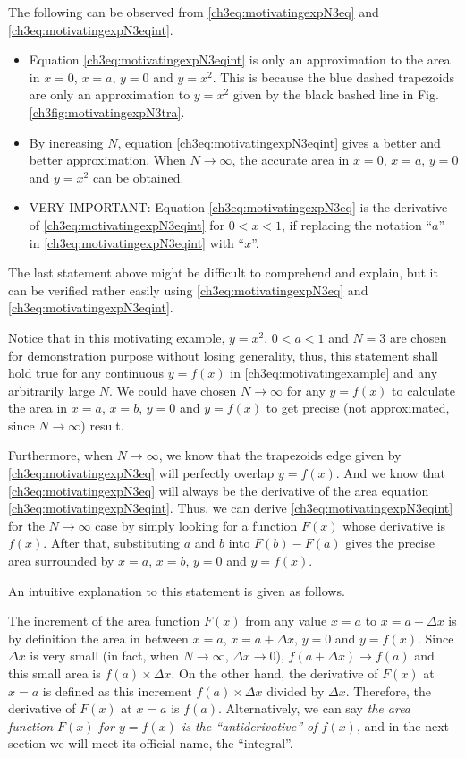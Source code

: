 The following can be observed from \eqref{ch3eq:motivatingexpN3eq} and \eqref{ch3eq:motivatingexpN3eqint}.
\begin{itemize}
    \item Equation \eqref{ch3eq:motivatingexpN3eqint} is only an approximation to the area in $x=0$, $x=a$, $y=0$ and $y=x^2$. This is because the blue dashed trapezoids are only an approximation to $y=x^2$ given by the black bashed line in Fig. \ref{ch3fig:motivatingexpN3tra}.
    \item By increasing $N$, equation \eqref{ch3eq:motivatingexpN3eqint} gives a better and better approximation. When $N\rightarrow \infty$, the accurate area in $x=0$, $x=a$, $y=0$ and $y=x^2$ can be obtained.
    \item VERY IMPORTANT: Equation \eqref{ch3eq:motivatingexpN3eq} is the derivative of \eqref{ch3eq:motivatingexpN3eqint} for $0 < x < 1$, if replacing the notation ``$a$'' in \eqref{ch3eq:motivatingexpN3eqint} with ``$x$''.
\end{itemize}

The last statement above might be difficult to comprehend and explain, but it can be verified rather easily using \eqref{ch3eq:motivatingexpN3eq} and \eqref{ch3eq:motivatingexpN3eqint}.

Notice that in this motivating example, $y=x^2$, $0 < a < 1$ and $N=3$ are chosen for demonstration purpose without losing generality, thus, this statement shall hold true for any continuous $y=f(x)$ in \eqref{ch3eq:motivatingexample} and any arbitrarily large $N$. We could have chosen $N\rightarrow\infty$ for any $y=f(x)$ to calculate the area in $x=a$, $x=b$, $y=0$ and $y=f(x)$ to get precise (not approximated, since $N\rightarrow\infty$) result.

Furthermore, when $N\rightarrow\infty$, we know that the trapezoids edge given by \eqref{ch3eq:motivatingexpN3eq} will perfectly overlap $y=f(x)$. And we know that \eqref{ch3eq:motivatingexpN3eq} will always be the derivative of the area equation \eqref{ch3eq:motivatingexpN3eqint}. Thus, we can derive \eqref{ch3eq:motivatingexpN3eqint} for the $N\rightarrow\infty$ case by simply looking for a function $F(x)$ whose derivative is $f(x)$. After that, substituting $a$ and $b$ into $F(b)-F(a)$ gives the precise area surrounded by $x = a$, $x = b$, $y=0$ and $y=f(x)$.

An intuitive explanation to this statement is given as follows.

The increment of the area function $F(x)$ from any value $x = a$ to $x = a + \Delta x$ is by definition the area in between $x=a$, $x=a + \Delta x$, $y=0$ and $y=f(x)$. Since $\Delta x$ is very small (in fact, when $N\rightarrow\infty$, $\Delta x \rightarrow 0$), $f(a+\Delta x) \rightarrow f(a)$ and this small area is $f(a)\times\Delta x$. On the other hand, the derivative of $F(x)$ at $x = a$ is defined as this increment $f(a)\times\Delta x$ divided by $\Delta x$. Therefore, the derivative of $F(x)$ at $x=a$ is $f(a)$. Alternatively, we can say \textit{the area function $F(x)$ for $y=f(x)$ is the ``antiderivative'' of $f(x)$}, and in the next section we will meet its official name, the ``integral''.

